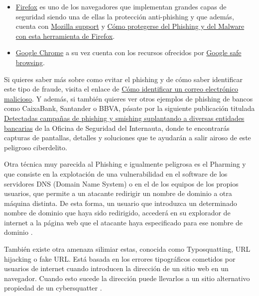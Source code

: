 \documentclass[
  spanish,
  a4paper,
  openany]{book}
\begin{document}
\begin{itemize}
  \begin{itemize}
  \item
    \href{https://www.mozilla.org/es-ES/firefox/}{Firefox} es uno de los navegadores que implementan grandes capas de seguridad siendo una de ellas la protección anti-phishing y que además, cuenta con \href{https://support.mozilla.org/es/}{Mozilla support} y \href{https://support.mozilla.org/es/kb/como-protegerse-del-phishing-y-del-malware-con-esta-herramienta-firefox}{Cómo protegerse del Phishing y del Malware con esta herramienta de Firefox}.
  \item
    \href{https://www.google.com/intl/es/chrome/}{Google Chrome} a su vez cuenta con los recursos ofrecidos por \href{https://safebrowsing.google.com/}{Google safe browsing}.
  \end{itemize}
\end{itemize}

Si quieres saber más sobre como evitar el phishing y de cómo saber identificar este tipo de fraude, visita el enlace de \href{https://www.osi.es/es/como-identificar-un-correo-electronico-malicioso}{Cómo identificar un correo electrónico malicioso}. Y además, si también quieres ver otros ejemplos de phishing de bancos como CaixaBank, Santander o BBVA, pásate por la siguiente publicación titulada \href{https://www.osi.es/es/actualidad/avisos/2021/06/detectadas-campanas-de-phishing-y-smishing-suplantando-diversas-entidades}{Detectadas campañas de phishing y smishing suplantando a diversas entidades bancarias} de la Oficina de Seguridad del Internauta, donde te encontrarás capturas de pantallas, detalles y soluciones que te ayudarán a salir airoso de este peligroso ciberdelito.

Otra técnica muy parecida al Phishing e igualmente peligrosa es el Pharming y que consiste en la explotación de una vulnerabilidad en el software de los servidores DNS (Domain Name System) o en el de los equipos de los propios usuarios, que permite a un atacante redirigir un nombre de dominio a otra máquina distinta. De esta forma, un usuario que introduzca un determinado nombre de dominio que haya sido redirigido, accederá en su explorador de internet a la página web que el atacante haya especificado para ese nombre de dominio \citep{KASPER-pharming}.

También existe otra amenaza silimiar estas, conocida como Typosquatting, URL hijacking o fake URL. Está basada en los errores tipográficos cometidos por usuarios de internet cuando introducen la dirección de un sitio web en un navegador. Cuando esto sucede la dirección puede llevarlos a un sitio alternativo propiedad de un cybersquatter \citep{WIKI-typosquatting}.
\end{document}
